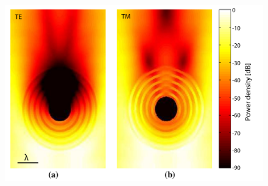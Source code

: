 \begin{figure}[tb]
	\includegraphics[width=\textwidth]{images/pml/oqe_coreshell.png}
\end{figure}



